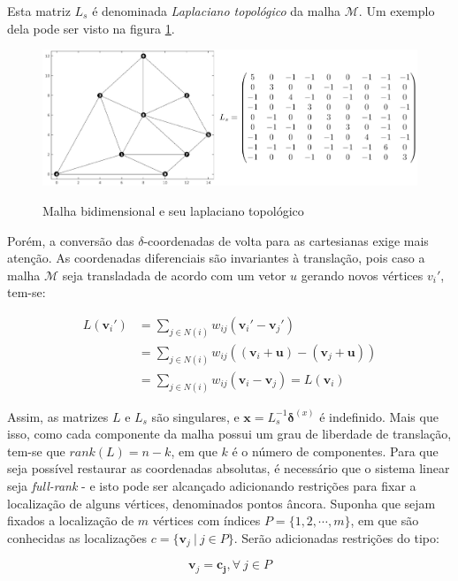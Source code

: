 Esta matriz $L_s$ é denominada \textit{Laplaciano topológico} da malha $\mathcal M$. Um exemplo dela pode ser visto na figura \ref{fig:grafo_lapl}.

\begin{figure}[htb]
    \centering
    \caption{Malha bidimensional e seu laplaciano topológico}
    \includegraphics{img/grafo_lapl.png}
    \label{fig:grafo_lapl}
\end{figure}

Porém, a conversão das $\delta$-coordenadas de volta para as cartesianas exige mais atenção. As coordenadas diferenciais são invariantes à translação, pois caso a malha $\mathcal{M}$ seja transladada de acordo com um vetor $u$ gerando novos vértices $v_i'$, tem-se:

\begin{align*}
	L(\mathbf{v}_i') &= \sum_{j \in N(i)} w_{ij} (\mathbf{v}_i' - \mathbf{v}_j')\\ 
	&= \sum_{j \in N(i)} w_{ij} ((\mathbf{v}_i + \mathbf{u})  - (\mathbf{v}_j + \mathbf{u}))\\ 
	&= \sum_{j \in N(i)} w_{ij} (\mathbf{v}_i - \mathbf{v}_j) = L(\mathbf{v}_i)
\end{align*}

Assim, as matrizes $L$ e $L_s$ são singulares, e $\mathbf{x} = L_s^{-1} \mathbf{\delta}^{(x)}$ é indefinido. Mais que isso, como cada componente da malha possui um grau de liberdade de translação, tem-se que $rank(L) = n - k$, em que $k$ é o número de componentes. Para que seja possível restaurar as coordenadas absolutas, é necessário que o sistema linear seja \textit{full-rank} - e isto pode ser alcançado adicionando restrições para fixar a localização de alguns vértices, denominados pontos âncora. Suponha que sejam fixados a localização de $m$ vértices com índices $P = \{1, 2, \cdots, m\}$, em que são conhecidas as localizações $c = \{\mathbf{v}_j\ |\ j \in P\}$. Serão adicionadas restrições do tipo:

$$\mathbf{v}_j = \mathbf{c_j}, \forall\ j \in P$$

